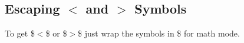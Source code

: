 
\subsection{Escaping $<$ and $>$ Symbols}
To get \$$<$\$ or \$$>$\$ just wrap the symbols in \$ for math mode.
